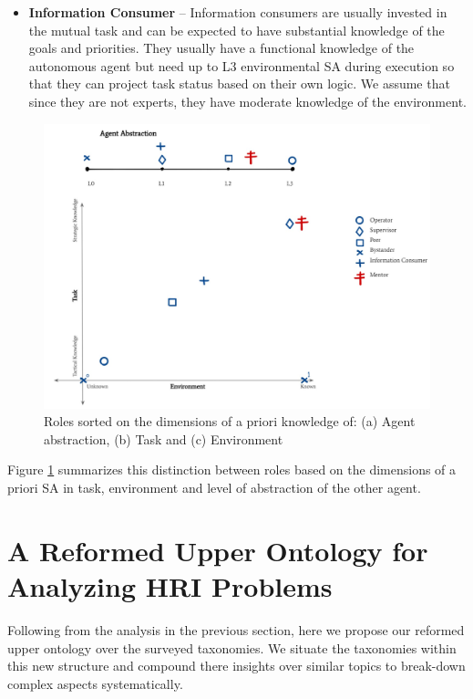 \documentclass[letterpaper, 10 pt, conference]{ieeeconf}  %
\theoremstyle{definition}
\begin{document}
{\begin{itemize}
    \item \textbf{Information Consumer} -- Information consumers are usually invested in the mutual task and can be expected to have substantial knowledge of the goals and priorities. They usually have a functional knowledge of the autonomous agent but need up to L3 environmental SA during execution so that they can project task status based on their own logic. We assume that since they are not experts, they have moderate knowledge of the environment.
\end{itemize}
\begin{figure}[tb]
    \centering
    \includegraphics[width=\columnwidth]{role-dims.jpg}
   \caption{Roles sorted on the dimensions of a priori knowledge of: (a) Agent abstraction, (b) Task and (c) Environment}
    \label{fig:role-dims}
\end{figure}

Figure \ref{fig:role-dims} summarizes this distinction between roles based on the dimensions of a priori SA in task, environment and level of abstraction of the other agent.
}

\section{A Reformed Upper Ontology for Analyzing HRI Problems}
\label{sec:upper-ontology}

Following from the analysis in the previous section, here we propose our reformed upper ontology over the surveyed taxonomies.
We situate the taxonomies within this new structure and compound there insights over similar topics to break-down complex aspects systematically.
\end{document}
